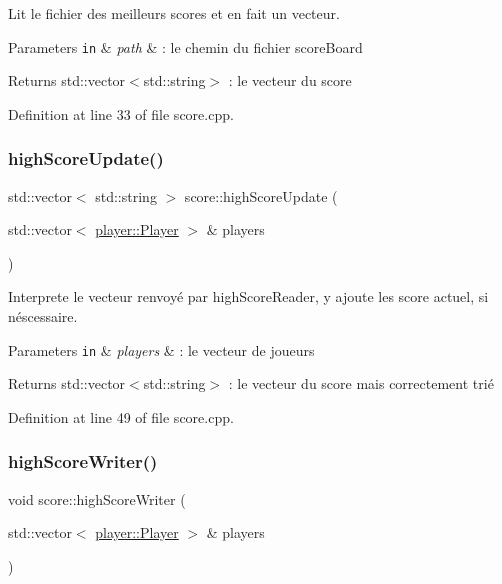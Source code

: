 Lit le fichier des meilleurs scores et en fait un vecteur. 


\begin{DoxyParams}[1]{Parameters}
\mbox{\tt in}  & {\em path} & \+: le chemin du fichier score\+Board \\
\hline
\end{DoxyParams}
\begin{DoxyReturn}{Returns}
std\+::vector$<$std\+::string$>$ \+: le vecteur du score 
\end{DoxyReturn}


Definition at line 33 of file score.\+cpp.

\mbox{\label{namespacescore_a80f57620018fa7797c3e4f1d34479277}} 
\subsubsection{\texorpdfstring{high\+Score\+Update()}{highScoreUpdate()}}
{\footnotesize\ttfamily std\+::vector$<$ std\+::string $>$ score\+::high\+Score\+Update (\begin{DoxyParamCaption}\item[{std\+::vector$<$ \hyperlink{structplayer_1_1_player}{player\+::\+Player} $>$ \&}]{players }\end{DoxyParamCaption})}



Interprete le vecteur renvoyé par high\+Score\+Reader, y ajoute les score actuel, si néscessaire. 


\begin{DoxyParams}[1]{Parameters}
\mbox{\tt in}  & {\em players} & \+: le vecteur de joueurs \\
\hline
\end{DoxyParams}
\begin{DoxyReturn}{Returns}
std\+::vector$<$std\+::string$>$ \+: le vecteur du score mais correctement trié 
\end{DoxyReturn}


Definition at line 49 of file score.\+cpp.

\mbox{\label{namespacescore_a67da81a4506de38ca8e841ba9251fbb3}} 
\subsubsection{\texorpdfstring{high\+Score\+Writer()}{highScoreWriter()}}
{\footnotesize\ttfamily void score\+::high\+Score\+Writer (\begin{DoxyParamCaption}\item[{std\+::vector$<$ \hyperlink{structplayer_1_1_player}{player\+::\+Player} $>$ \&}]{players }\end{DoxyParamCaption})}



